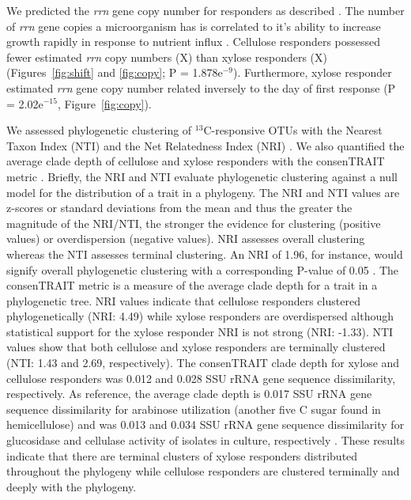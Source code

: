 We predicted the \textit{rrn} gene copy number for responders as described
\citep{Kembel_2012}. The number of \textit{rrn} gene copies
a microorganism has is correlated to it's ability to increase growth
rapidly in response to nutrient influx \citep{Klappenbach_2000}. Cellulose
responders possessed fewer estimated \textit{rrn} copy numbers (X) than  xylose
responders (X) (Figures~\ref{fig:shift} and \ref{fig:copy}; P = 1.878e$^{-9}$).
Furthermore, xylose responder estimated \textit{rrn} gene copy number related
inversely to the day of first response (P = 2.02e$^{-15}$,
Figure~\ref{fig:copy}).

We assessed phylogenetic clustering of $^{13}$C-responsive OTUs with the
Nearest Taxon Index (NTI) and the Net Relatedness Index (NRI)
\citep{Webb2000}. We also quantified the average clade depth of cellulose and
xylose responders with the consenTRAIT metric \citep{Martiny2013}. Briefly, the
NRI and NTI evaluate phylogenetic clustering against a null model for the
distribution of a trait in a phylogeny. The NRI and NTI values are z-scores or
standard deviations from the mean and thus the greater the magnitude of the
NRI/NTI, the stronger the evidence for clustering (positive values) or
overdispersion (negative values). NRI assesses overall clustering whereas the
NTI assesses terminal clustering. An NRI of 1.96, for instance, would signify
overall phylogenetic clustering with a corresponding P-value of 0.05
\citep{Evans2014a}. The consenTRAIT metric is a measure of the average clade
depth for a trait in a phylogenetic tree. NRI values indicate that cellulose
responders clustered phylogenetically (NRI: 4.49) while xylose responders are
overdispersed although statistical support for the xylose responder NRI is not
strong (NRI: -1.33). NTI values show that both cellulose and xylose responders
are terminally clustered (NTI: 1.43 and 2.69, respectively). The consenTRAIT
clade depth for xylose and cellulose responders was 0.012 and 0.028 SSU rRNA
gene sequence dissimilarity, respectively. As reference, the average clade
depth is
0.017 SSU rRNA gene sequence dissimilarity for arabinose utilization (another
five C sugar found in hemicellulose) and was 0.013 and 0.034 SSU rRNA gene
sequence dissimilarity for glucosidase and cellulase activity of isolates in
culture, respectively \citep{Martiny2013,Berlemont2013}. These results
indicate that there are terminal clusters of xylose responders distributed
throughout the phylogeny while cellulose responders are clustered terminally
and deeply with the phylogeny.
